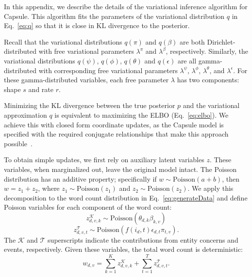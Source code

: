 
In this appendix, we describe the details of the variational inference algorithm for Capsule. This algorithm fits the parameters of the variational distribution $q$ in Eq.~\ref{eq:q} so that it is close in KL divergence to the posterior.

Recall that the variational distributions $q(\pi)$ and $q(\beta)$ are both Dirichlet-distributed with free variational parameters $\lambda^\pi$ and $\lambda^\beta$, respectively.  Similarly, the variational distributions $q(\psi)$, $q(\phi)$, $q(\theta)$ and $q(\epsilon)$ are all gamma-distributed with corresponding free variational parameters $\lambda^\psi$, $\lambda^\phi$, $\lambda^\theta$, and $\lambda^\epsilon$.  For these gamma-distributed variables, each free parameter $\lambda$ has two components: shape $s$ and rate $r$.

Minimizing the KL divergence between the true posterior $p$ and the variational approximation $q$ is equivalent to maximizing the ELBO (Eq.~\ref{eq:elbo}).  We achieve this with closed form coordinate updates, as the Capsule model is specified with the required conjugate relationships that make this approach possible~\cite{Ghahramani:2001}.

To obtain simple updates, we first rely on auxiliary latent variables $z$. These variables, when marginalized out, leave the original model intact. The Poisson distribution has an additive property; specifically if $w \sim \mbox{Poisson}(a+b)$, then $w = z_1 + z_2$, where $z_1 \sim \mbox{Poisson}(z_1)$ and $z_2 \sim \mbox{Poisson}(z_2)$.  We apply this decomposition to the word count distribution in Eq.~\ref{eq:generateData} and define Poisson variables for each component of the word count:
\[ z^\mathcal{K}_{d,v,k} \sim \mbox{Poisson}(\theta_{d,k}\beta_{k,v}) \]
\[ z^\mathcal{T}_{d,v,t} \sim \mbox{Poisson}\left(f(i_d, t) \epsilon_{d,t} \pi_{t,v}\right). \]
The $\mathcal{K}$ and $\mathcal{T}$ superscripts indicate the contributions from entity concerns and events, respectively.  Given these variables, the total word count is deterministic:
\[ w_{d,v} = \sum_{k=1}^K z^\mathcal{K}_{d,v,k} + \sum_{t=1}^T z^\mathcal{T}_{d,v,t}. \]

